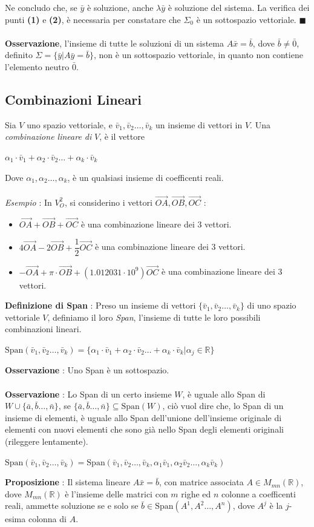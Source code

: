\documentclass[12pt, letterpaper]{article}
\newcommand{\R}{{\mathbb R}}
\newcommand{\acc}{\\\hphantom{}\\}
\newcommand{\Span}{{\text{Span}}}
\begin{document}
Ne concludo che, se \(\bar y\) è soluzione, anche \(\lambda \bar y\) è soluzione del sistema. La verifica 
dei punti \textbf{(1)} e \textbf{(2)}, è necessaria per constatare che \(\Sigma_0\) è un sottospazio vettoriale. \(\blacksquare\)
\acc \textbf{Osservazione}, l'insieme di tutte le soluzioni di un sistema \(A\bar x = \bar b\), dove 
\(\bar b \ne \bar 0\), definito \(\Sigma = \{\bar y | A\bar y = \bar b\}\), non è un sottospazio vettoriale, in 
quanto non contiene l'elemento neutro \(\bar 0\).
\subsection{Combinazioni Lineari}
Sia \(V\) uno spazio vettoriale, e \(\bar v_1,\bar v_2\dots, \bar v_k\) un insieme di vettori in \(V\). 
Una \textit{combinazione lineare di }\(V\), è il vettore \begin{center}
    \(\alpha_1\cdot\bar v_1+\alpha_2\cdot\bar v_2\dots+ \alpha_k\cdot\bar v_k\)
\end{center}
Dove \(\alpha_1,\alpha_2\dots,\alpha_k\), è un qualsiasi insieme di coefficenti reali.\acc \textit{Esempio} : 
In \(V_O^2\), si considerino i vettori \(\vec{OA},\vec{OB},\vec{OC}\) : \begin{itemize}
    \item \(\vec{OA}+\vec{OB}+\vec{OC}\) è una combinazione lineare dei 3 vettori.
    \item \(4\vec{OA}-2\vec{OB}+\dfrac{1}{2}\vec{OC}\) è una combinazione lineare dei 3 vettori.
    \item \(-\vec{OA}+\pi\cdot \vec{OB}+(1.012031\cdot 10^9)\vec{OC}\) è una combinazione lineare dei 3 vettori.
\end{itemize}
\textbf{Definizione di Span} : Preso un insieme di vettori \(\{\bar v_1,\bar v_2\dots, \bar v_k\}\) di 
uno spazio vettoriale \(V\), definiamo il loro \textit{Span}, l'insieme di tutte le loro possibili combinazioni lineari.
\begin{center}
    \(\Span(\bar v_1,\bar v_2\dots, \bar v_k)=\{\alpha_1\cdot\bar v_1+\alpha_2\cdot\bar v_2\dots+ \alpha_k\cdot\bar v_k|\alpha_j\in \R\}\)
\end{center}
\textbf{Osservazione} : Uno Span è un sottospazio.\acc 
\textbf{Osservazione} : Lo Span di un certo insieme \(W\), è uguale allo Span di \(W\cup \{\bar a,\bar b\dots, \bar n\}\), se 
\(\{\bar a,\bar b\dots, \bar n\}\subseteq \Span(W)\), ciò vuol dire che, lo Span 
di un insieme di elementi, è uguale allo Span dell'unione dell'insieme originale di elementi con nuovi 
elementi che sono già nello Span degli elementi originali (rileggere lentamente).\begin{center}
    \(
    \Span(\bar v_1,\bar v_2\dots, \bar v_k)= \Span(\bar v_1,\bar v_2\dots, \bar v_k,\alpha_1\bar v_1,\alpha_2\bar v_2\dots, \alpha_k\bar v_k)
    \)
\end{center}
\textbf{Proposizione }: Il sistema lineare \(A\bar x = \bar b\), con matrice associata \(A\in M_{mn}(\R)\), dove 
\(M_{mn}(\R)\) è l'insieme delle matrici con \(m\) righe ed \(n\) colonne a coefficenti reali, ammette 
soluzione se e solo se \(\bar b \in \Span(A^1,A^2\dots, A^n)\), dove \(A^j\) è la \(j\)-esima colonna di \(A\). 
\end{document}
